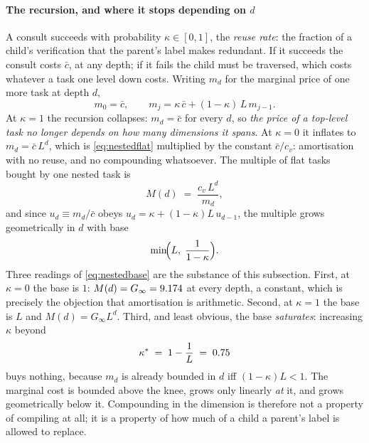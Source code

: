 \documentclass[conference]{IEEEtran}
\theoremstyle{definition}
\begin{document}
\paragraph{The recursion, and where it stops depending on $d$} A consult succeeds
with probability $\kappa\in[0,1]$, the \emph{reuse rate}: the fraction of a
child's verification that the parent's label makes redundant. If it succeeds the
consult costs $\bar c$, at any depth; if it fails the child must be traversed,
which costs whatever a task one level down costs. Writing $m_d$ for the marginal
price of one more task at depth $d$,
\begin{equation}
m_0=\bar c,
\qquad
m_{j}=\kappa\,\bar c+(1-\kappa)\,L\,m_{j-1}.
\label{eq:nestedrecursion}
\end{equation}
At $\kappa=1$ the recursion collapses: $m_d=\bar c$ for every $d$, so
\emph{the price of a top-level task no longer depends on how many dimensions it
spans}. At $\kappa=0$ it inflates to $m_d=\bar c\,L^{d}$, which is
\eqref{eq:nestedflat} multiplied by the constant $\bar c/c_v$: amortisation with
no reuse, and no compounding whatsoever. The multiple of flat tasks bought by one
nested task is
\begin{equation}
M(d)\;=\;\frac{c_v\,L^{d}}{m_d},
\label{eq:nestedmultiple}
\end{equation}
and since $u_d\equiv m_d/\bar c$ obeys $u_d=\kappa+(1-\kappa)L\,u_{d-1}$, the
multiple grows geometrically in $d$ with base
\begin{equation}
\min\!\Bigl(L,\;\frac{1}{1-\kappa}\Bigr).
\label{eq:nestedbase}
\end{equation}
Three readings of \eqref{eq:nestedbase} are the substance of this subsection.
First, at $\kappa=0$ the base is $1$: $M(d)=G_\infty=9.174$ at every depth,
a constant, which is precisely the objection that amortisation is arithmetic.
Second, at $\kappa=1$ the base is $L$ and $M(d)=G_\infty L^{d}$. Third, and least
obvious, the base \emph{saturates}: increasing $\kappa$ beyond
\begin{equation}
\kappa^{*}\;=\;1-\frac{1}{L}\;=\;0.75
\label{eq:nestedknee}
\end{equation}
buys nothing, because $m_d$ is already bounded in $d$ iff $(1-\kappa)L<1$. The
marginal cost is bounded above the knee, grows only linearly \emph{at} it, and
grows geometrically below it. Compounding in the dimension is therefore not a
property of compiling at all; it is a property of how much of a child a parent's
label is allowed to replace.
\end{document}
